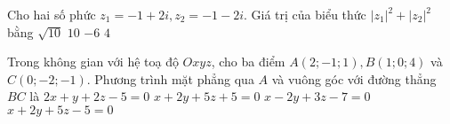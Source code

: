 \begin{ex}%
	Cho hai số phức $z_1=-1+2i,z_2=-1-2i$. Giá trị của biểu thức ${\left| z_1\right|}^2+{\left| z_2\right|}^2$ bằng
	\choice
	{$\sqrt{10}$}
	{\True $10$}
	{$-6$}
	{$4$}
\end{ex}


\begin{ex}%
	Trong không gian với hệ toạ độ $Oxyz$, cho ba điểm $A\left(2; -1; 1\right),B\left(1; 0;4\right)$ và $C\left(0; -2; -1\right)$. Phương trình mặt phẳng qua $A$ và vuông góc với đường thẳng $BC$ là
	\choice
	{$2x+y+2z-5=0$}
	{$x+2y+5z+5=0$}
	{$x-2y+3z-7=0$}
	{\True $x+2y+5z-5=0$}
\end{ex}


